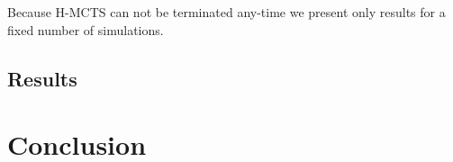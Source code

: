 \documentclass{kecsmstr}
\begin{document}
Because H-MCTS can not be terminated any-time we present only results for a fixed number of simulations.

\section{Results}

\chapter{Conclusion}
\label{chap:conclusion}

 \emptypage

\appendix



 \emptypage

\end{document}
